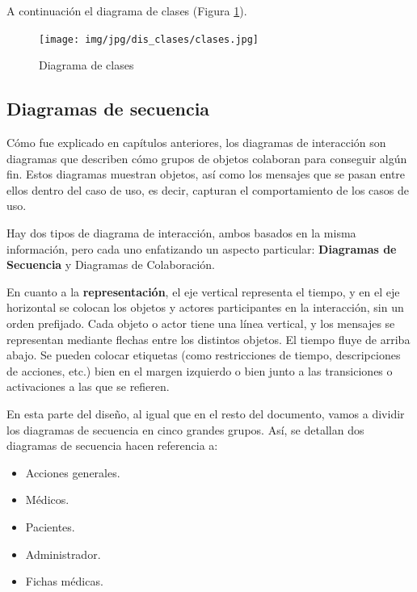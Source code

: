 \documentclass[a4paper,oneside,11pt]{book}
\begin{document}
			A continuación el diagrama de clases (Figura \ref{fig:dis_clases}).

			\begin{figure}[H]
			  \centering
			    \texttt{[image: img/jpg/dis\_clases/clases.jpg]}
			  \caption{Diagrama de clases}
			  \label{fig:dis_clases}
			\end{figure}

	\newpage
	\subsection{Diagramas de secuencia} %
		\label{sec:diagramas_de_secuencia}

			Cómo fue explicado en capítulos anteriores, los diagramas de interacción son diagramas que describen cómo grupos de objetos colaboran para conseguir algún fin. Estos diagramas muestran objetos, así como los mensajes que se pasan entre ellos dentro del caso de uso, es decir, capturan el comportamiento de los casos de uso.

			Hay dos tipos de diagrama de interacción, ambos basados en la misma información, pero cada uno enfatizando un aspecto particular: \textbf{Diagramas de Secuencia} y Diagramas de Colaboración.

			\medskip


			\medskip

			En cuanto a la \textbf{representación}, el eje vertical representa el tiempo, y en el eje horizontal se colocan los objetos y actores participantes en la interacción, sin un orden prefijado. Cada objeto o actor tiene una línea vertical, y los mensajes se representan mediante flechas entre los distintos objetos. El tiempo fluye de arriba abajo. Se pueden colocar etiquetas (como restricciones de tiempo, descripciones de acciones, etc.) bien en el margen izquierdo o bien junto a las transiciones o activaciones a las que se refieren. 

			En esta parte del diseño, al igual que en el resto del documento, vamos a dividir los diagramas de secuencia en cinco grandes grupos. Así, se detallan dos diagramas de secuencia hacen referencia a:
			\begin{itemize}
				\item Acciones generales.
				\item Médicos.
				\item Pacientes.
				\item Administrador.
				\item Fichas médicas.
			\end{itemize}
			
\end{document}
